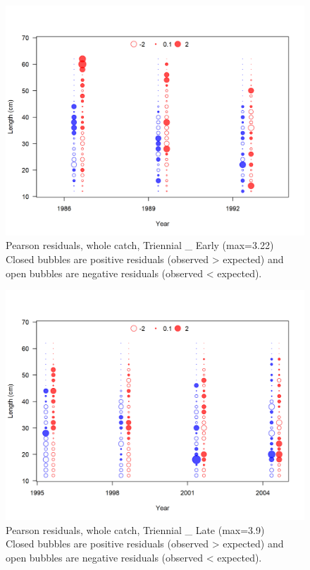 \documentclass[12pt,]{article}
\begin{document}
\begin{figure}
\centering
\includegraphics{r4ss/plots_mod1/comp_lenfit_residsflt5mkt0.png}
\caption{Pearson residuals, whole catch, Triennial \_ Early (max=3.22)\\
Closed bubbles are positive residuals (observed \textgreater{} expected)
and open bubbles are negative residuals (observed \textless{} expected).
\label{fig:tri_early_len_pearson}}
\end{figure}

\begin{figure}
\centering
\includegraphics{r4ss/plots_mod1/comp_lenfit_residsflt6mkt0.png}
\caption{Pearson residuals, whole catch, Triennial \_ Late (max=3.9)\\
Closed bubbles are positive residuals (observed \textgreater{} expected)
and open bubbles are negative residuals (observed \textless{} expected).
\label{fig:tri_late_len_pearson}}
\end{figure}
\end{document}
